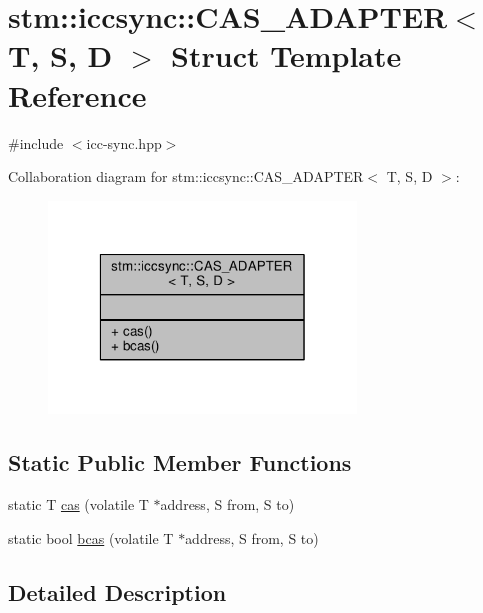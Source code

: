 \hypertarget{structstm_1_1iccsync_1_1CAS__ADAPTER}{\section{stm\-:\-:iccsync\-:\-:C\-A\-S\-\_\-\-A\-D\-A\-P\-T\-E\-R$<$ T, S, D $>$ Struct Template Reference}
\label{structstm_1_1iccsync_1_1CAS__ADAPTER}
}


{\ttfamily \#include $<$icc-\/sync.\-hpp$>$}



Collaboration diagram for stm\-:\-:iccsync\-:\-:C\-A\-S\-\_\-\-A\-D\-A\-P\-T\-E\-R$<$ T, S, D $>$\-:
\nopagebreak
\begin{figure}[H]
\begin{center}
\leavevmode
\includegraphics[width=232pt]{structstm_1_1iccsync_1_1CAS__ADAPTER__coll__graph}
\end{center}
\end{figure}
\subsection*{Static Public Member Functions}
\begin{DoxyCompactItemize}
\item 
static T \hyperlink{structstm_1_1iccsync_1_1CAS__ADAPTER_a3d399617d9c4d8cdf232370135500ae0}{cas} (volatile T $\ast$address, S from, S to)
\item 
static bool \hyperlink{structstm_1_1iccsync_1_1CAS__ADAPTER_a0080f226afaea04d6a7fae81e095963b}{bcas} (volatile T $\ast$address, S from, S to)
\end{DoxyCompactItemize}


\subsection{Detailed Description}
